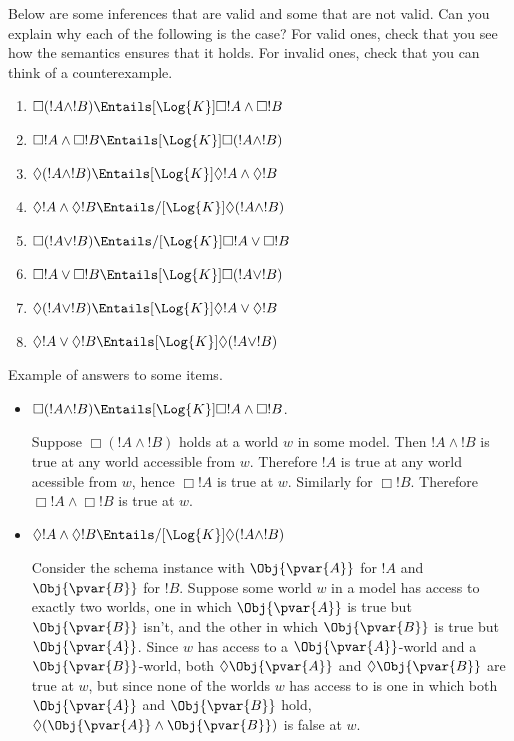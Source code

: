\documentclass[../../../include/open-logic-section]{subfiles}
\begin{document}
\begin{prob}
    Below are some inferences that are valid and some that are not 
    valid. Can you explain why each of the following is the case? 
    For valid ones, check that you see how the semantics ensures that it holds. 
    For invalid ones, check that you can think of a counterexample.
    \begin{enumerate}
        \item $\Box(!A\land!B) \Entails[\Log{K}] \Box !A \land \Box !B$
        \item $\Box !A \land \Box !B \Entails[\Log{K}] \Box(!A \land !B)$
        \item $\Diamond(!A\land!B) \Entails[\Log{K}] \Diamond !A \land \Diamond !B$
        \item $\Diamond!A\land\Diamond!B \Entails/[\Log{K}] \Diamond (!A \land !B)$
        \item $\Box(!A\lor!B) \Entails/[\Log{K}] \Box !A \lor \Box !B$
        \item $\Box !A \lor \Box !B \Entails[\Log{K}] \Box (!A \lor !B)$
        \item $\Diamond(!A\lor!B) \Entails[\Log{K}] \Diamond !A \lor \Diamond !B$
        \item $\Diamond !A \lor \Diamond !B \Entails[\Log{K}] \Diamond(!A\lor!B)$ 
    \end{enumerate}

    \begin{ans}
    Example of answers to some items.
    \begin{itemize}
    \item $\Box(!A\land!B) \Entails[\Log{K}] \Box !A \land \Box !B$.
    
        Suppose $\Box(!A\land!B)$ holds at a world $w$ in some model.
        Then $!A\land!B$ is true at any world accessible from $w$.
        Therefore $!A$ is true at any world acessible from $w$, hence
        $\Box!A$ is true at $w$. Similarly for $\Box!B$. Therefore
        $\Box !A \land \Box !B$ is true at $w$.

    \item $\Diamond!A\land\Diamond!B \Entails/[\Log{K}] \Diamond (!A \land !B)$
    
        Consider the schema instance with $\Obj{\pvar{A}}$ for $!A$ 
        and $\Obj{\pvar{B}}$ for $!B$. Suppose some world $w$ in a 
        model has access to exactly two worlds, one in which $\Obj{\pvar{A}}$
        is true but $\Obj{\pvar{B}}$ isn't, and the other in which 
        $\Obj{\pvar{B}}$ is true but $\Obj{\pvar{A}}$. Since $w$ has
        access to a $\Obj{\pvar{A}}$-world and a $\Obj{\pvar{B}}$-world,
        both $\Diamond\Obj{\pvar{A}}$ and $\Diamond\Obj{\pvar{B}}$ 
        are true at $w$, but since none of the worlds $w$ has access
        to is one in which both $\Obj{\pvar{A}}$ and $\Obj{\pvar{B}}$
        hold, $\Diamond (\Obj{\pvar{A}} \land \Obj{\pvar{B}})$ is false at $w$.


\end{itemize}
\end{ans}
\end{prob}
\end{document}
